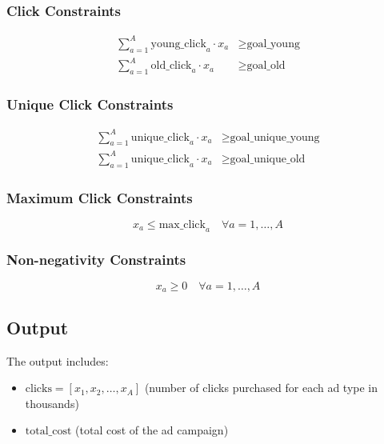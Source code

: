 \documentclass{article}
\begin{document}
\subsubsection*{Click Constraints}
\begin{align}
\sum_{a=1}^{A} \text{young\_click}_a \cdot x_a & \geq \text{goal\_young} \\
\sum_{a=1}^{A} \text{old\_click}_a \cdot x_a & \geq \text{goal\_old}
\end{align}

\subsubsection*{Unique Click Constraints}
\begin{align}
\sum_{a=1}^{A} \text{unique\_click}_a \cdot x_a & \geq \text{goal\_unique\_young} \\
\sum_{a=1}^{A} \text{unique\_click}_a \cdot x_a & \geq \text{goal\_unique\_old}
\end{align}

\subsubsection*{Maximum Click Constraints}
\[
x_a \leq \text{max\_click}_a \quad \forall a = 1, \ldots, A
\]

\subsubsection*{Non-negativity Constraints}
\[
x_a \geq 0 \quad \forall a = 1, \ldots, A
\]

\subsection*{Output}
The output includes:
\begin{itemize}
    \item \( \text{clicks} = [x_1, x_2, \ldots, x_A] \) (number of clicks purchased for each ad type in thousands)
    \item \( \text{total\_cost} \) (total cost of the ad campaign)
\end{itemize}
\end{document}
